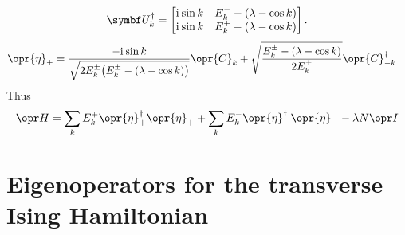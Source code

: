 \documentclass[../thesis.tex]{subfiles}
\begin{document}
\begin{equation}
  \mq{U}_k^\dag
  = \bmqty{%
    \im\sin k & E_k^- - (\lambda - \cos k) \\
    \im\sin k & E_k^+ - (\lambda - \cos k)
  }.
\end{equation}
\begin{align}
  \opr{\eta}_\pm
  &= \frac{-\im\sin k}{\sqrt{2E_k^\pm \qty(E_k^\pm - (\lambda - \cos k))}}
  \opr{C}_k
  + \sqrt{\frac{E_k^\pm - (\lambda - \cos k)}{2E_k^\pm}}
  \opr{C}^\dag_{-k}
\end{align}
Thus
\begin{equation}
  \ham
  = \sum_k E_k^+\opr{\eta}_+^\dag\opr{\eta}_+
  + \sum_k E_k^-\opr{\eta}_-^\dag\opr{\eta}_-
  - \lambda N \idopr
\end{equation}

\section{Eigenoperators for the transverse Ising Hamiltonian}
\end{document}
